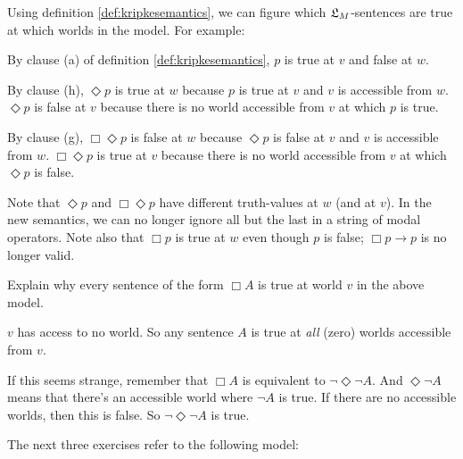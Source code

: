 \begin{center}
\end{center}
%
Using definition \ref{def:kripkesemantics}, we can figure which $\mathfrak{L}_M$-sentences
are true at which worlds in the model. For example:

\begin{itemize*}
  \item By clause (a) of definition \ref{def:kripkesemantics}, $p$ is true at
  $v$ and false at $w$.
  \item By clause (h), $\Diamond p$ is true at $w$ because $p$ is true at $v$
  and $v$ is accessible from $w$. $\Diamond p$ is false at $v$ because there is
  no world accessible from $v$ at which $p$ is true.
  \item By clause (g), $\Box\Diamond p$ is false at $w$ because $\Diamond p$ is
  false at $v$ and $v$ is accessible from $w$. $\Box\Diamond p$ is true at $v$
  because there is no world accessible from $v$ at which $\Diamond p$ is false.
\end{itemize*}
%
Note that $\Diamond p$ and $\Box \Diamond p$ have different truth-values at $w$
(and at $v$). In the new semantics, we can no longer ignore all but the last in a
string of modal operators. Note also that $\Box p$ is true at $w$ even though
$p$ is false; $\Box p \to p$ is no longer valid.

\begin{exercise}
  Explain why every sentence of the form $\Box A$ is true at world $v$
  in the above model.
\end{exercise}
\begin{solution}
  $v$ has access to no world. So any sentence $A$ is true at
  \emph{all} (zero) worlds accessible from $v$.

  If this seems strange, remember that $\Box A$ is equivalent to
  $\neg \Diamond \neg A$. And $\Diamond \neg A$ means that there's an
  accessible world where $\neg A$ is true. If there are no accessible
  worlds, then this is false. So $\neg \Diamond \neg A$ is true.
\end{solution}

The next three exercises refer to the following model:
%
\begin{center}
\end{center}

